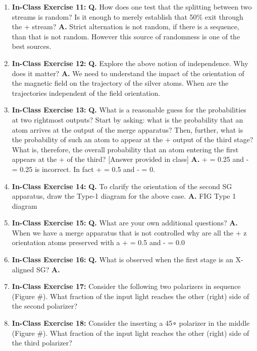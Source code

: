 \documentclass[main.tex]{subfiles}
\begin{document}
\begin{enumerate}
\item[] \textbf{In-Class Exercise 11:} \textbf{Q.} How does one test that the splitting between two streams is random? Is it enough to merely establish that 50\% exit through the + stream? \textbf{A.} Strict alternation is not random, if there is a sequence, than that is not random. However this source of randomness is one of the best sources.

\item[] \textbf{In-Class Exercise 12:} \textbf{Q.} Explore the above notion of independence. Why does it matter? \textbf{A.} We need to understand the impact of the orientation of the magnetic field on the trajectory of the silver atoms. When are the trajectories independent of the field orientation.

\item[] \textbf{In-Class Exercise 13:} \textbf{Q.} What is a reasonable guess for the probabilities at two rightmost outputs? Start by asking: what is the probability that an atom arrives at the output of the merge apparatus? Then, further, what is the probability of such an atom to appear at the + output of the third stage? What is, therefore, the overall probability that an atom entering the first appears at the + of the third? [Answer provided in class] \textbf{A.} + = 0.25 and - = 0.25 is incorrect. In fact + = 0.5 and - = 0.

\item[] \textbf{In-Class Exercise 14:} \textbf{Q.} To clarify the orientation of the second SG apparatus, draw the Type-1 diagram for the above case. \textbf{A.} FIG Type 1 diagram

\item[] \textbf{In-Class Exercise 15:} \textbf{Q.} What are your own additional questions? \textbf{A.} When we have a merge apparatus that is not controlled why are all the + z orientation atoms preserved with a + = 0.5 and - = 0.0

\item[] \textbf{In-Class Exercise 16:} \textbf{Q.} What is observed when the first stage is an X-aligned SG? \textbf{A.} 

\item[] \textbf{In-Class Exercise 17:} Consider the following two polarizers in sequence (Figure #). What fraction of the input light reaches the other (right) side of the second polarizer?

\item[] \textbf{In-Class Exercise 18:} Consider the inserting a 45∘ polarizer in the middle (Figure #). What fraction of the input light reaches the other (right) side of the third polarizer?


\end{enumerate}
\end{document}
